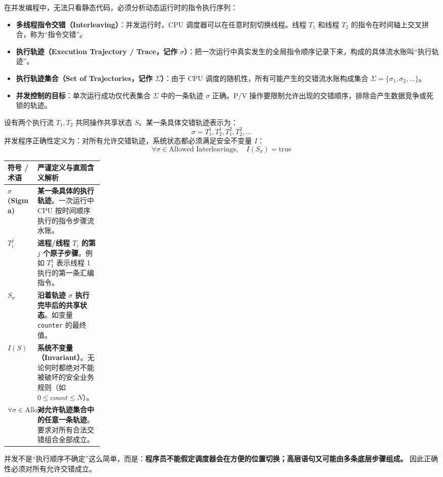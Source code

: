 \documentclass[11pt,a4paper]{ctexart}
\newcommand{\kw}[1]{\textbf{#1}}
\newcommand{\code}[1]{\texttt{#1}}
\begin{document}
在并发编程中，无法只看静态代码，必须分析动态运行时的指令执行序列：
\begin{itemize}[leftmargin=1.5em]
\item \kw{多线程指令交错（Interleaving）}：并发运行时，CPU 调度器可以在任意时刻切换线程。线程 $T_1$ 和线程 $T_2$ 的指令在时间轴上交叉拼合，称为“指令交错”。
\item \kw{执行轨迹（Execution Trajectory / Trace，记作 $\sigma$）}：把一次运行中真实发生的全局指令顺序记录下来，构成的具体流水账叫“执行轨迹”。
\item \kw{执行轨迹集合（Set of Trajectories，记作 $\Sigma$）}：由于 CPU 调度的随机性，所有可能产生的交错流水账构成集合 $\Sigma = \{\sigma_1, \sigma_2, \ldots\}$。
\item \kw{并发控制的目标}：单次运行成功仅代表集合 $\Sigma$ 中的一条轨迹 $\sigma$ 正确。P/V 操作要限制允许出现的交错顺序，排除会产生数据竞争或死锁的轨迹。
\end{itemize}

设有两个执行流 $T_1,T_2$ 共同操作共享状态 $S$。某一条具体交错轨迹表示为：
\[
\sigma=T_1^1,T_2^1,T_1^2,T_2^2,\ldots
\]
并发程序正确性定义为：对所有允许交错轨迹，系统状态都必须满足安全不变量 $I$：
\[
\boxed{\forall\sigma\in\text{Allowed Interleavings},\quad I(S_\sigma)=\mathrm{true}}
\]

\begingroup
\small
\renewcommand{\arraystretch}{1.25}
\begin{tabularx}{\linewidth}{>{\bfseries}p{0.22\linewidth} X}
\toprule
符号 / 术语 & 严谨定义与直观含义解析 \\
\midrule
$\sigma$ (Sigma) & \kw{某一条具体的执行轨迹}。一次运行中 CPU 按时间顺序执行的指令步骤流水账。 \\
$T_i^j$ & \kw{进程/线程 $T_i$ 的第 $j$ 个原子步骤}。例如 $T_1^1$ 表示线程 1 执行的第一条汇编指令。 \\
$S_\sigma$ & \kw{沿着轨迹 $\sigma$ 执行完毕后的共享状态}。如变量 \code{counter} 的最终值。 \\
$I(S)$ & \kw{系统不变量（Invariant）}。无论何时都绝对不能被破坏的安全业务规则（如 $0 \le count \le N$）。 \\
$\forall\sigma \in \text{Allowed Interleavings}$ & \kw{对允许轨迹集合中的任意一条轨迹}。要求对所有合法交错组合全部成立。 \\
\bottomrule
\end{tabularx}
\endgroup

\begin{corebox}[并发篇第一原则]
并发不是“执行顺序不确定”这么简单，而是：\kw{程序员不能假定调度器会在方便的位置切换；高层语句又可能由多条底层步骤组成。} 因此正确性必须对所有允许交错成立。
\end{corebox}
\end{document}
